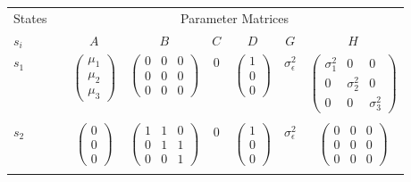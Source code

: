 \documentclass[12pt]{article}
\begin{document}
\begin{table}
\centering
\begin{tabular}[h!]{@{}llccccccc@{}}
\toprule
  \multicolumn{2}{c}{States} &\phantom{a}& \multicolumn{6}{c}{Parameter Matrices}\\
  \cmidrule{1-2} \cmidrule{4-9}
  $s_i$ &&& $A$ & $B$ & $C$ & $D$ & $G$ & $H$ \\
  \midrule
  $s_1$ & && $\begin{pmatrix} \mu_1 \\ \mu_2 \\ \mu_3 \end{pmatrix}$ & $\begin{pmatrix} 0&0&0 \\ 0&0&0 \\ 0&0&0 \end{pmatrix}$ & 0 & $\begin{pmatrix} 1\\ 0 \\ 0 \end{pmatrix}$ & $\sigma_\epsilon^2$ & $\begin{pmatrix} \sigma_1^2&0&0 \\ 0&\sigma_2^2&0 \\ 0&0&\sigma_3^2 \end{pmatrix}$\\
  \\
  $s_2$ & && $\begin{pmatrix} 0 \\ 0 \\ 0 \end{pmatrix}$ & $\begin{pmatrix} 1&1&0 \\ 0&1&1 \\ 0&0&1 \end{pmatrix}$ & 0 & $\begin{pmatrix} 1\\ 0 \\ 0 \end{pmatrix}$ & $\sigma_\epsilon^2$ & $\begin{pmatrix} 0&0&0 \\ 0&0&0 \\ 0&0&0 \end{pmatrix}$\\
  \\

\end{tabular}
\end{table}
\end{document}
